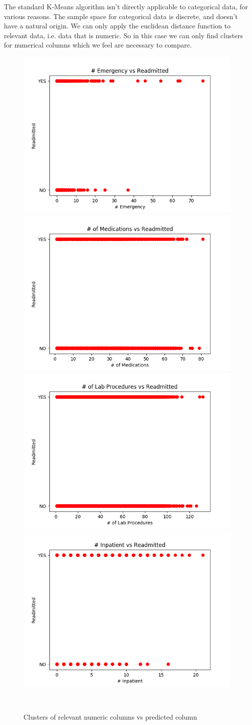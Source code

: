 \documentclass[11pt]{report}
\begin{document}
\noindent
The standard K-Means algorithm isn't directly applicable to categorical data, for various reasons. The sample space for categorical data is discrete, and doesn't have a natural origin. We can only apply the euclidean distance function to relevant data, i.e. data that is numeric. So in this case we can only find clusters for numerical columns which we feel are necessary to compare.

\begin{figure}[!ht]
   \begin{minipage}{\textwidth}
     \centering
     \includegraphics[width=.4\textwidth]{emergency_clust.png}\quad
     \includegraphics[width=.4\textwidth]{meds_clust.png}\\
     \includegraphics[width=.4\textwidth]{proc_clust.png}\quad
     \includegraphics[width=.4\textwidth]{inpatient_clust.png}
     \caption{Clusters of relevant numeric columns vs predicted column}
   \end{minipage}\\[1em]
\end{figure}
\end{document}
